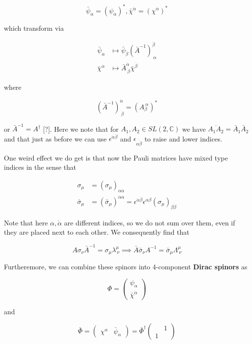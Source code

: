 \documentclass{article}
\theoremstyle{definition}
\begin{document}
$$ \bar{\psi}_{\dot{\alpha}} = (\psi_\alpha)^*, \bar{\chi}^{\dot{\alpha}} =
(\chi^\alpha)^* $$

which transform via

\begin{align*}
\bar{\psi}_{\dot{\alpha}} &\mapsto \bar{\psi}_{\dot{\beta}} (\bar{A}^{-1})^{\dot{\beta}}_{\ \dot{\alpha}} \\
\bar{\chi}^{\dot{\alpha}} &\mapsto \bar{A}^{\dot{\alpha}}_{\ \dot{\beta}} \bar{\chi}^{\dot{\beta}} 
\end{align*}

where 

$$ (\bar{A}^{-1})^{\dot{\alpha}}_{\ \dot{\beta}} = (A_\beta^{\ \alpha})^* $$

or $\bar{A}^{-1} = A^\dagger$ [?]. Here we note that for $A_1, A_2 \in SL(2,
\mathbb{C})$ we have $\overline{A_1 A_2} = \bar{A}_1 \bar{A}_2$ and that just as
before we can use $\epsilon^{\dot{\alpha}\dot{\beta}}$ and
$\epsilon_{\dot{\alpha \dot{\beta}}}$ to raise and lower indices. 

One weird effect we do get is that now the Pauli matrices have mixed type
indices in the sense that

\begin{align*}
\sigma_\mu &= (\sigma_\mu)_{\alpha \dot{\alpha}} \\
\bar{\sigma}_\mu &= (\bar{\sigma}_\mu)^{\dot{\alpha} \alpha} = \epsilon^{\dot{\alpha} \dot{\beta}} \epsilon^{\alpha \beta} (\sigma_\mu)_{\beta \dot{\beta}} 
\end{align*}

Note that here $\alpha, \dot{\alpha}$ are different indices, so we do not sum
over them, even if they are placed next to each other. We consequently find that

$$ A \sigma_\nu \bar{A}^{-1} = \sigma_\mu \lambda^\mu_{\ \nu} \implies \bar{A}
\bar{\sigma}_\nu A^{-1} = \bar{\sigma}_\mu \Lambda^\mu_{\ \nu} $$

Furtheremore, we can combine these spinors into 4-component \textbf{Dirac
  spinors} as 

$$ \Phi = 
\begin{pmatrix}
\psi_\alpha \\
\bar{\chi}^{\dot{\alpha}}
\end{pmatrix} $$

and 

$$ \bar{\Phi} = 
\begin{pmatrix} \chi^\alpha & \bar{\psi}_\alpha \end{pmatrix}
= \bar{\Phi}^\dagger 
\begin{pmatrix}
& 1 \\
1 & 
\end{pmatrix} $$
\end{document}
